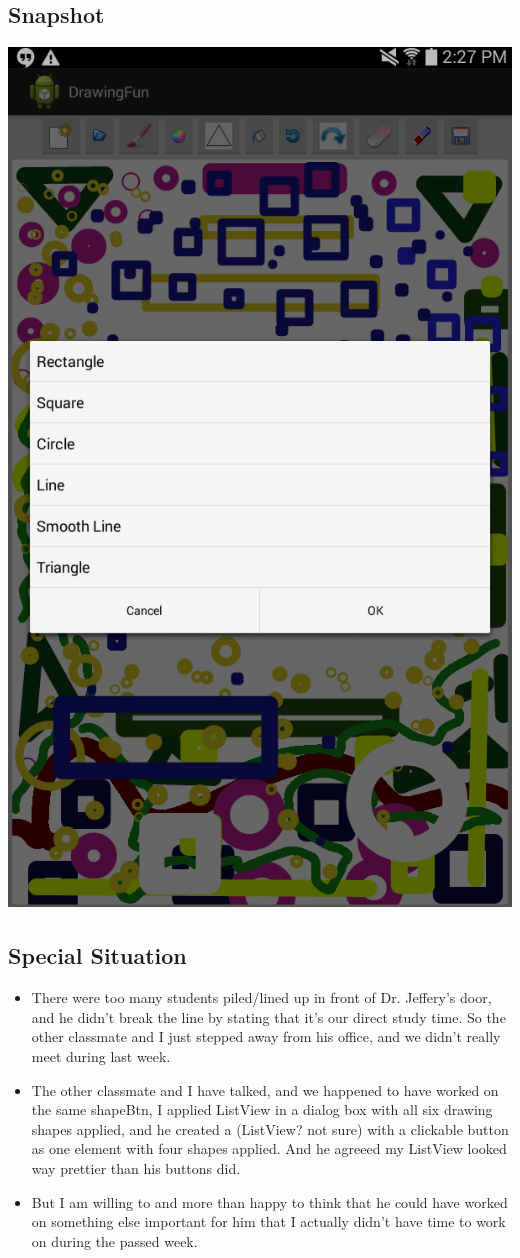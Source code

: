\documentclass[9pt,b5paper]{article}
\begin{document}
\subsection{Snapshot}
\label{sec-3-3}
\includegraphics[width=.9\linewidth]{./20141110-14-27-05.png}
\subsection{Special Situation}
\label{sec-3-4}
\begin{itemize}
\item There were too many students piled/lined up in front of Dr. Jeffery's door, and he didn't break the line by stating that it's our direct study time. So the other classmate and I just stepped away from his office, and we didn't really meet during last week.
\item The other classmate and I have talked, and we happened to have worked on the same shapeBtn, I applied ListView in a dialog box with all six drawing shapes applied, and he created a (ListView? not sure) with a clickable button as one element with four shapes applied. And he agreeed my ListView looked way prettier than his buttons did.
\item But I am willing to and more than happy to think that he could have worked on something else important for him that I actually didn't have time to work on during the passed week.
\end{itemize}
\end{document}
